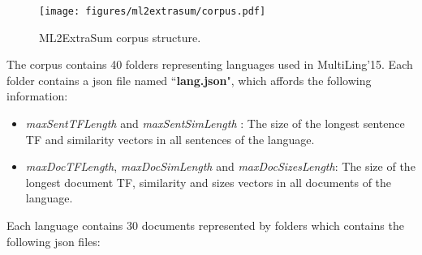 \begin{figure}[!ht]
	\centering
	\texttt{[image: figures/ml2extrasum/corpus.pdf]} %
	\caption{ML2ExtraSum corpus structure.}
	\label{fig:ml2extrasum-corpus}
\end{figure}

The corpus contains 40 folders representing languages used in MultiLing'15. 
Each folder contains a json file named ``\textbf{lang.json}", which affords the following information: 
\begin{itemize}
	\item \textit{maxSentTFLength} and \textit{maxSentSimLength} : The size of the longest sentence TF and similarity vectors in all sentences of the language.
	\item \textit{maxDocTFLength}, \textit{maxDocSimLength} and \textit{maxDocSizesLength}: The size of the longest document TF, similarity and sizes vectors in all documents of the language.
\end{itemize}
Each language contains 30 documents represented by folders which contains the following json files:
